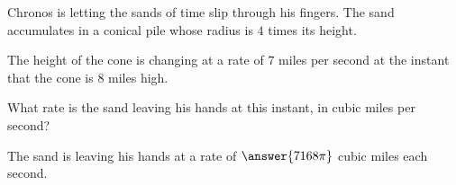 \documentclass{ximera}
\author{Steven Gubkin}
\begin{document}
\begin{exercise}



    Chronos is letting the sands of time slip through his fingers.  The sand accumulates in a conical pile whose radius is $4$ times its height.
        		
The  height of the cone is changing at a rate of $7$ miles per second at the instant that the cone is $8$ miles high.

What rate is the sand leaving his hands at this instant, in cubic miles per second?

\begin{prompt}
	The sand is leaving his hands at a rate of $ \answer{7168\pi}$ cubic miles each second.
\end{prompt}

\end{exercise}
\end{document}
